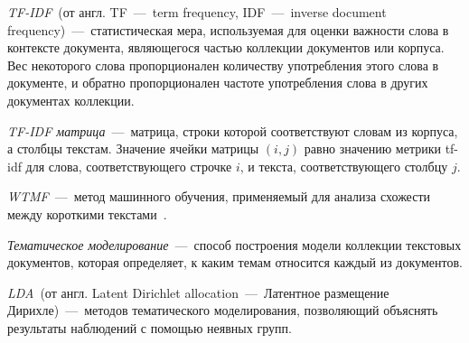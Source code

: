     \textit{TF-IDF}~(от англ. TF~---~term frequency, IDF~---~inverse document frequency)~---~статистическая мера, используемая для оценки важности слова в контексте документа,
    являющегося частью коллекции документов или корпуса.
    Вес некоторого слова пропорционален количеству употребления этого слова в документе, и обратно пропорционален частоте употребления слова в других документах коллекции.

    \textit{TF-IDF матрица}~---~матрица, строки которой соответствуют словам из корпуса, а столбцы текстам.
    Значение ячейки матрицы $(i,j)$ равно значению метрики tf-idf для слова, соответствующего строчке $i$, и текста, соответствующего столбцу $j$.

    \textit{WTMF}~---~метод машинного обучения, применяемый для анализа схожести между короткими текстами~\cite{wtmf}.

    \textit{Тематическое моделирование}~---~способ построения модели коллекции текстовых документов, которая определяет, к каким темам относится каждый из документов.

    \textit{LDA}~(от англ. Latent Dirichlet allocation~---~Латентное размещение Дирихле)~---~методов тематического моделирования,
    позволяющий объяснять результаты наблюдений с помощью неявных групп.



%
%
%

%
%


